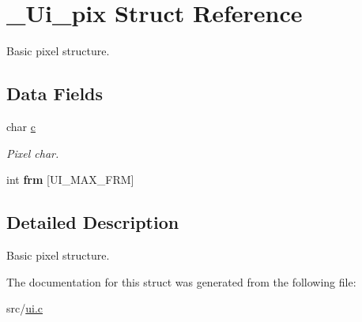 \hypertarget{struct__Ui__pix}{}\section{\+\_\+\+Ui\+\_\+pix Struct Reference}
\label{struct__Ui__pix}


Basic pixel structure.  


\subsection*{Data Fields}
\begin{DoxyCompactItemize}
\item 
\mbox{\label{struct__Ui__pix_aa12b962b28524e2f295d0fd90b9595a8}} 
char \hyperlink{struct__Ui__pix_aa12b962b28524e2f295d0fd90b9595a8}{c}
\begin{DoxyCompactList}\small\item\em Pixel char. \end{DoxyCompactList}\item 
\mbox{\label{struct__Ui__pix_a139bbde94a87ff7907f964e27db4620a}} 
int {\bfseries frm} \mbox{[}U\+I\+\_\+\+M\+A\+X\+\_\+\+F\+RM\mbox{]}
\end{DoxyCompactItemize}


\subsection{Detailed Description}
Basic pixel structure. 

The documentation for this struct was generated from the following file\+:\begin{DoxyCompactItemize}
\item 
src/\hyperlink{ui_8c}{ui.\+c}\end{DoxyCompactItemize}
